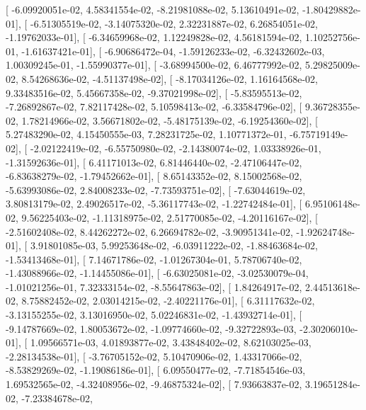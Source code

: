 \documentclass{article}
\begin{document}
       [ -6.09920051e-02,   4.58341554e-02,  -8.21981088e-02,
          5.13610491e-02,  -1.80429882e-01],
       [ -6.51305519e-02,  -3.14075320e-02,   2.32231887e-02,
          6.26854051e-02,  -1.19762033e-01],
       [ -6.34659968e-02,   1.12249828e-02,   4.56181594e-02,
          1.10252756e-01,  -1.61637421e-01],
       [ -6.90686472e-04,  -1.59126233e-02,  -6.32432602e-03,
          1.00309245e-01,  -1.55990377e-01],
       [ -3.68994500e-02,   6.46777992e-02,   5.29825009e-02,
          8.54268636e-02,  -4.51137498e-02],
       [ -8.17034126e-02,   1.16164568e-02,   9.33483516e-02,
          5.45667358e-02,  -9.37021998e-02],
       [ -5.83595513e-02,  -7.26892867e-02,   7.82117428e-02,
          5.10598413e-02,  -6.33584796e-02],
       [  9.36728355e-02,   1.78214966e-02,   3.56671802e-02,
         -5.48175139e-02,  -6.19254360e-02],
       [  5.27483290e-02,   4.15450555e-03,   7.28231725e-02,
          1.10771372e-01,  -6.75719149e-02],
       [ -2.02122419e-02,  -6.55750980e-02,  -2.14380074e-02,
          1.03338926e-01,  -1.31592636e-01],
       [  6.41171013e-02,   6.81446440e-02,  -2.47106447e-02,
         -6.83638279e-02,  -1.79452662e-01],
       [  8.65143352e-02,   8.15002568e-02,  -5.63993086e-02,
          2.84008233e-02,  -7.73593751e-02],
       [ -7.63044619e-02,   3.80813179e-02,   2.49026517e-02,
         -5.36117743e-02,  -1.22742484e-01],
       [  6.95106148e-02,   9.56225403e-02,  -1.11318975e-02,
          2.51770085e-02,  -4.20116167e-02],
       [ -2.51602408e-02,   8.44262272e-02,   6.26694782e-02,
         -3.90951341e-02,  -1.92624748e-01],
       [  3.91801085e-03,   5.99253648e-02,  -6.03911222e-02,
         -1.88463684e-02,  -1.53413468e-01],
       [  7.14671786e-02,  -1.01267304e-01,   5.78706740e-02,
         -1.43088966e-02,  -1.14455086e-01],
       [ -6.63025081e-02,  -3.02530079e-04,  -1.01021256e-01,
          7.32333154e-02,  -8.55647863e-02],
       [  1.84264917e-02,   2.44513618e-02,   8.75882452e-02,
          2.03014215e-02,  -2.40221176e-01],
       [  6.31117632e-02,  -3.13155255e-02,   3.13016950e-02,
          5.02246831e-02,  -1.43932714e-01],
       [ -9.14787669e-02,   1.80053672e-02,  -1.09774660e-02,
         -9.32722893e-03,  -2.30206010e-01],
       [  1.09566571e-03,   4.01893877e-02,   3.43848402e-02,
          8.62103025e-03,  -2.28134538e-01],
       [ -3.76705152e-02,   5.10470906e-02,   1.43317066e-02,
         -8.53829269e-02,  -1.19086186e-01],
       [  6.09550477e-02,  -7.71854546e-03,   1.69532565e-02,
         -4.32408956e-02,  -9.46875324e-02],
       [  7.93663837e-02,   3.19651284e-02,  -7.23384678e-02,
\end{document}
